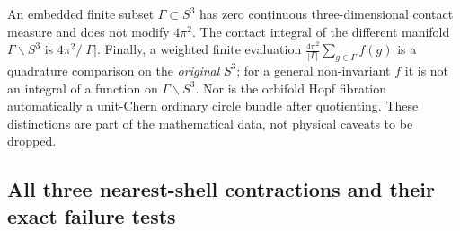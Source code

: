 \documentclass[11pt]{article}
\begin{document}
\begin{remark}
\label{p1b:rem:v11-embedding-quotient-sampling}
An embedded finite subset $\Gamma\subset S^3$ has zero continuous
three-dimensional contact measure and does not modify $4\pi^2$.
The contact integral of the different manifold $\Gamma\backslash S^3$
is $4\pi^2/|\Gamma|$.  Finally, a weighted finite evaluation
$\frac{4\pi^2}{|\Gamma|}\sum_{g\in\Gamma}f(g)$ is a quadrature
comparison on the \emph{original} $S^3$; for a general non-invariant
$f$ it is not an integral of a function on $\Gamma\backslash S^3$.
Nor is the orbifold Hopf fibration automatically a unit-Chern ordinary
circle bundle after quotienting.  These distinctions are part of the
mathematical data, not physical caveats to be dropped.
\end{remark}

\subsection{All three nearest-shell contractions and their exact failure tests}
\label{p1b:subsec:v11-shell-contractions}
\end{document}
